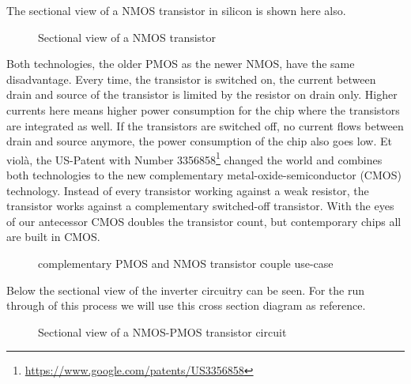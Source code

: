 The sectional view of a NMOS transistor in silicon is shown here also.
\begin{figure}[H]
	\centering
	\begin{tikzpicture}[node distance = 3cm, auto, thick,scale=0.5, every node/.style={transform shape}]
		
	\end{tikzpicture}
	\caption{Sectional view of a NMOS transistor}
\end{figure}

Both technologies, the older PMOS as the newer NMOS, have the same disadvantage. Every time, the transistor is switched on, the current between drain and source of the transistor is limited by the resistor on drain only. Higher currents here means higher power consumption for the chip where the transistors are integrated as well. If the transistors are switched off, no current flows between drain and source anymore, the power consumption of the chip also goes low.
Et violà, the US-Patent with Number 3356858\footnote{\url{https://www.google.com/patents/US3356858}} changed the world and combines both technologies to the new complementary metal-oxide-semiconductor (CMOS) technology. Instead of every transistor working against a weak resistor, the transistor works against a complementary switched-off transistor. With the eyes of our antecessor CMOS doubles the transistor count, but contemporary chips all are built in CMOS.

\begin{figure}[H]
	\centering
	\begin{circuitdiagram}{20}{20}
	\end{circuitdiagram}
	\caption{complementary PMOS and NMOS transistor couple use-case}
\end{figure}

Below the sectional view of the inverter circuitry can be seen.
For the run through of this process we will use this cross section diagram as reference.
\begin{figure}[H]
	\centering
	\begin{tikzpicture}[node distance = 3cm, auto, thick,scale=0.5, every node/.style={transform shape}]
		
	\end{tikzpicture}
	\caption{Sectional view of a NMOS-PMOS transistor circuit}
\end{figure}
